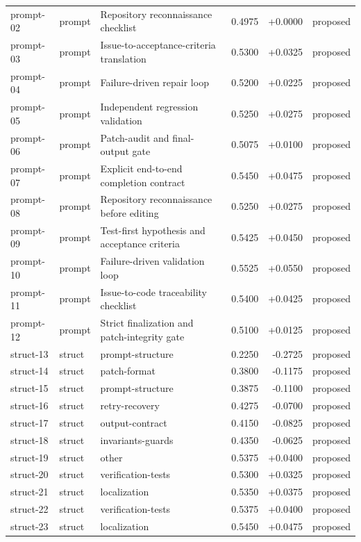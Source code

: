 \begin{center}
\begin{longtable}{llp{5.2cm}rrl}
prompt-02 & prompt & Repository reconnaissance checklist & 0.4975 & +0.0000 & proposed \\
prompt-03 & prompt & Issue-to-acceptance-criteria translation & 0.5300 & +0.0325 & proposed \\
prompt-04 & prompt & Failure-driven repair loop & 0.5200 & +0.0225 & proposed \\
prompt-05 & prompt & Independent regression validation & 0.5250 & +0.0275 & proposed \\
prompt-06 & prompt & Patch-audit and final-output gate & 0.5075 & +0.0100 & proposed \\
prompt-07 & prompt & Explicit end-to-end completion contract & 0.5450 & +0.0475 & proposed \\
prompt-08 & prompt & Repository reconnaissance before editing & 0.5250 & +0.0275 & proposed \\
prompt-09 & prompt & Test-first hypothesis and acceptance criteria & 0.5425 & +0.0450 & proposed \\
prompt-10 & prompt & Failure-driven validation loop & 0.5525 & +0.0550 & proposed \\
prompt-11 & prompt & Issue-to-code traceability checklist & 0.5400 & +0.0425 & proposed \\
prompt-12 & prompt & Strict finalization and patch-integrity gate & 0.5100 & +0.0125 & proposed \\
struct-13 & struct & prompt-structure & 0.2250 & -0.2725 & proposed \\
struct-14 & struct & patch-format & 0.3800 & -0.1175 & proposed \\
struct-15 & struct & prompt-structure & 0.3875 & -0.1100 & proposed \\
struct-16 & struct & retry-recovery & 0.4275 & -0.0700 & proposed \\
struct-17 & struct & output-contract & 0.4150 & -0.0825 & proposed \\
struct-18 & struct & invariants-guards & 0.4350 & -0.0625 & proposed \\
struct-19 & struct & other & 0.5375 & +0.0400 & proposed \\
struct-20 & struct & verification-tests & 0.5300 & +0.0325 & proposed \\
struct-21 & struct & localization & 0.5350 & +0.0375 & proposed \\
struct-22 & struct & verification-tests & 0.5375 & +0.0400 & proposed \\
struct-23 & struct & localization & 0.5450 & +0.0475 & proposed \\

\end{longtable}
\end{center}
